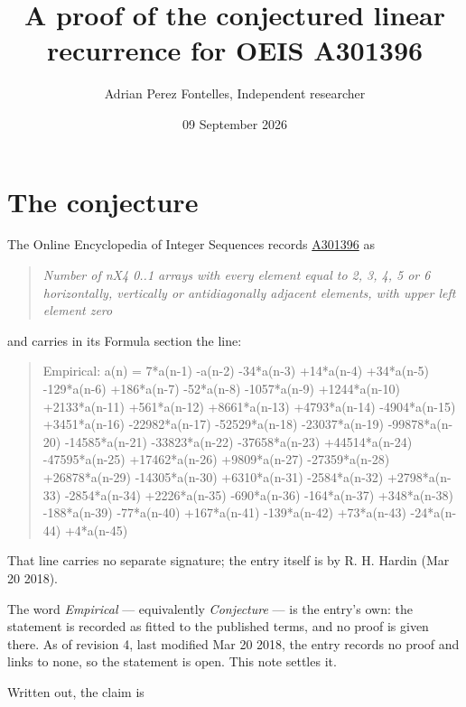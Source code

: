 \documentclass[11pt]{article}
\title{A proof of the conjectured linear recurrence for OEIS A301396}
\author{Adrian Perez Fontelles, Independent researcher}
\date{09 September 2026}
\theoremstyle{definition}
\begin{document}
\maketitle
\section{The conjecture}

The Online Encyclopedia of Integer Sequences records \href{https://oeis.org/A301396}{A301396} as

\begin{quote}\itshape Number of nX4 0..1 arrays with every element equal to 2, 3, 4, 5 or 6 horizontally, vertically or antidiagonally adjacent elements, with upper left element zero\end{quote}

and carries in its Formula section the line:

\begin{quote}\ttfamily Empirical: a(n) = 7*a(n-1) -a(n-2) -34*a(n-3) +14*a(n-4) +34*a(n-5) -129*a(n-6) +186*a(n-7) -52*a(n-8) -1057*a(n-9) +1244*a(n-10) +2133*a(n-11) +561*a(n-12) +8661*a(n-13) +4793*a(n-14) -4904*a(n-15) +3451*a(n-16) -22982*a(n-17) -52529*a(n-18) -23037*a(n-19) -99878*a(n-20) -14585*a(n-21) -33823*a(n-22) -37658*a(n-23) +44514*a(n-24) -47595*a(n-25) +17462*a(n-26) +9809*a(n-27) -27359*a(n-28) +26878*a(n-29) -14305*a(n-30) +6310*a(n-31) -2584*a(n-32) +2798*a(n-33) -2854*a(n-34) +2226*a(n-35) -690*a(n-36) -164*a(n-37) +348*a(n-38) -188*a(n-39) -77*a(n-40) +167*a(n-41) -139*a(n-42) +73*a(n-43) -24*a(n-44) +4*a(n-45)\end{quote}

That line carries no separate signature; the entry itself is by R. H. Hardin (Mar 20 2018).

The word {\itshape Empirical} --- equivalently {\itshape Conjecture} --- is the entry's own: the statement is recorded as fitted to the published terms, and no proof is given there. As of revision 4, last modified Mar 20 2018, the entry records no proof and links to none, so the statement is open. This note settles it.

Written out, the claim is
\end{document}
